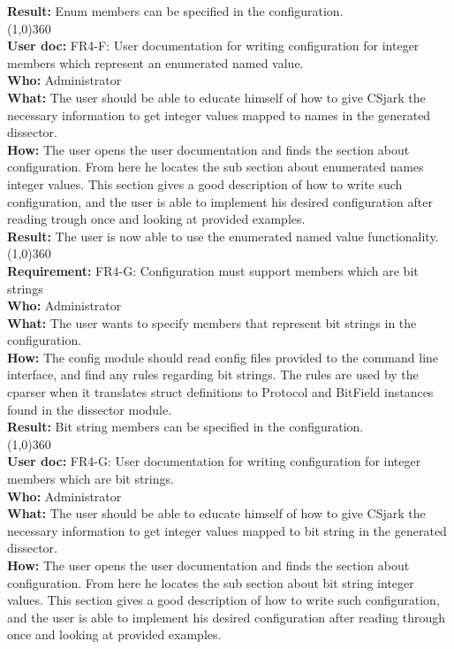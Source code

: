 \textbf{Result:} Enum members can be specified in the configuration.\\
\line(1,0){360}\\
\textbf{User doc:} FR4-F: User documentation for writing configuration for integer members which represent an enumerated named value.\\
\textbf{Who:} Administrator\\
\textbf{What:} The user should be able to educate himself of how to give CSjark the necessary information to get integer values mapped to names in the generated dissector.\\
\textbf{How:} The user opens the user documentation and finds the section about configuration. From here he locates the sub section about enumerated names integer values. This section gives a good description of how to write such configuration, and the user is able to implement his desired configuration after reading trough once and looking at provided examples.\\
\textbf{Result:} The user is now able to use the enumerated named value functionality.\\
\line(1,0){360}\\
\textbf{Requirement:} FR4-G: Configuration must support members which are bit strings\\
\textbf{Who:} Administrator\\
\textbf{What:} The user wants to specify members that represent bit strings in the configuration.\\
\textbf{How:} The config module should read config files provided to the command line interface, and find any rules regarding bit strings. The rules are used by the cparser when it translates struct definitions to Protocol and BitField instances found in the dissector module.\\
\textbf{Result:} Bit string members can be specified in the configuration.\\
\line(1,0){360}\\
\textbf{User doc:} FR4-G: User documentation for writing configuration for integer members which are bit strings.\\
\textbf{Who:} Administrator\\
\textbf{What:} The user should be able to educate himself of how to give CSjark the necessary information to get integer values mapped to bit string in the generated dissector.\\
\textbf{How:} The user opens the user documentation and finds the section about configuration. From here he locates the sub section about bit string integer values. This section gives a good description of how to write such configuration, and the user is able to implement his desired configuration after reading through once and looking at provided examples.\\
